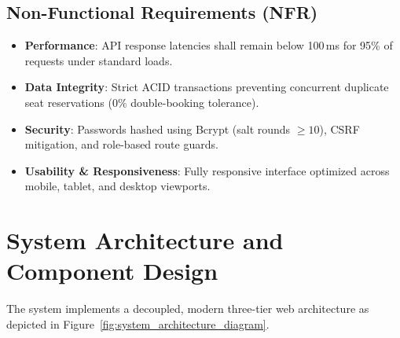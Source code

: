 \subsection{Non-Functional Requirements (NFR)}
\begin{itemize}
    \item \textbf{Performance}: API response latencies shall remain below 100\,ms for 95\% of requests under standard loads.
    \item \textbf{Data Integrity}: Strict ACID transactions preventing concurrent duplicate seat reservations ($0\%$ double-booking tolerance).
    \item \textbf{Security}: Passwords hashed using Bcrypt (salt rounds $\ge 10$), CSRF mitigation, and role-based route guards.
    \item \textbf{Usability \& Responsiveness}: Fully responsive interface optimized across mobile, tablet, and desktop viewports.
\end{itemize}

\section{System Architecture and Component Design}
The system implements a decoupled, modern three-tier web architecture as depicted in Figure~\ref{fig:system_architecture_diagram}.

